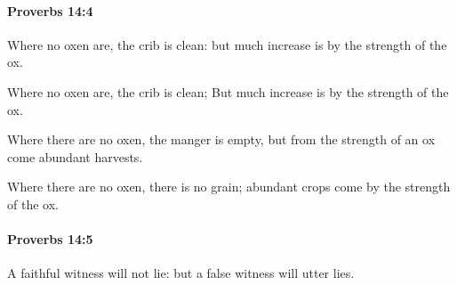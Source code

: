 		\paragraph{Proverbs 14:4} %
			\label{PROVERBS-14-4}

			Where no oxen are, the crib is clean: but much increase is by the strength of the ox.

			\begin{versebox}
					\item[BHS] 
					\item[ASV] Where no oxen are, the crib is clean; But much increase is by the strength of the ox.
					\item[NIV] Where there are no oxen, the manger is empty, but from the strength of an ox come abundant harvests.
					\item[NRSV] Where there are no oxen, there is no grain; abundant crops come by the strength of the ox.
			\end{versebox}

		\paragraph{Proverbs 14:5} %
			\label{PROVERBS-14-5}

			A faithful witness will not lie: but a false witness will utter lies.

